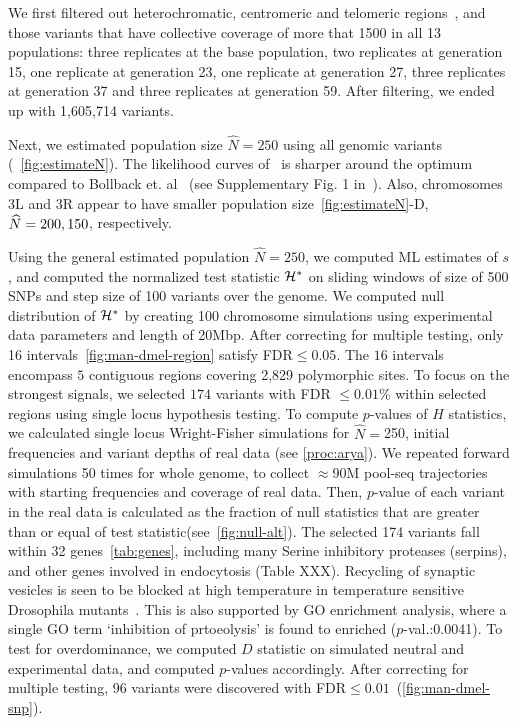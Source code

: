 We first filtered out heterochromatic, centromeric and telomeric
regions~\cite{fiston2010drosophila}, and those variants that have
collective coverage of more that 1500 in all 13 populations: three
replicates at the base population, two replicates at generation 15,
one replicate at generation 23, one replicate at generation 27, three
replicates at generation 37 and three replicates at generation
59. After filtering, we ended up with 1,605,714 variants.

Next, we estimated population size $\hat{N}=250$ using all genomic
variants (~\ref{fig:estimateN}). The likelihood curves of \comale\ is
sharper around the optimum compared to Bollback
et. al~\cite{bollback2008estimation} (see Supplementary Fig. 1
in~\cite{orozco2012adaptation}).  Also, chromosomes 3L and 3R appear
to have smaller population size~\ref{fig:estimateN}-D, $\widehat{N}=200,150$,
respectively. 

Using the general estimated population $\hat{N}=250$, we computed ML
estimates of $s$, and computed the normalized test statistic ${\cal H}^*$
on sliding windows of size of 500 SNPs and step size of 100 variants
over the genome.  We computed null distribution of ${\cal H}^*$ by creating
100 chromosome simulations using experimental data parameters and
length of 20Mbp. After correcting for multiple testing, only 16
intervals~\ref{fig:man-dmel-region} satisfy FDR$\le0.05$. The $16$
intervals encompass $5$ contiguous regions covering 2,829 polymorphic
sites. To focus on the strongest signals, we selected $174$ variants
with FDR $\le0.01$\% within selected regions using single locus
hypothesis testing.  To compute $p$-values of $H$ statistics, we
calculated single locus Wright-Fisher simulations for
$\widehat{N}=$250, initial frequencies and variant depths of real data
(see \ref{proc:arya}). We repeated forward simulations 50 times for
whole genome, to collect $\approx$90M pool-seq trajectories with
starting frequencies and coverage of real data. Then, $p$-value of
each variant in the real data is calculated as the fraction of null
statistics that are greater than or equal of test
statistic(see~\ref{fig:null-alt}).
The selected 174 variants fall within 32 genes~\ref{tab:genes},
including many Serine inhibitory proteases (serpins), and other genes
involved in endocytosis (Table XXX). Recycling of synaptic vesicles is
seen to be blocked at high temperature in temperature sensitive
Drosophila mutants~\cite{KosakaJnlCellBiol1983}. This is also
supported by GO enrichment analysis, where a single GO term
`inhibition of prtoeolysis' is found to enriched ($p$-val.:0.0041).
To test for overdominance, we computed $D$ statistic on simulated
neutral and experimental data, and computed $p$-values accordingly.
After correcting for multiple testing, 96 variants were discovered
with FDR$\le 0.01$~(\ref{fig:man-dmel-snp}).

